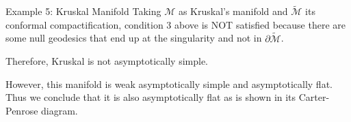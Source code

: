 \documentclass{beamer}
\begin{document}
        \begin{frame}{Example 5: Kruskal Manifold}
           	Taking $\mathcal{M}$ as Kruskal's manifold  and $\tilde{\mathcal{M}}$
its conformal compactification, condition 3 above is NOT satisfied
because there are some null geodesics that end up at the singularity
and not in $\partial\tilde{\mathcal{M}}$.\\
\pause

Therefore, Kruskal is not asymptotically simple.\\
\pause

However, this manifold is weak asymptotically simple and asymptotically flat. Thus we conclude that it is also asymptotically flat as is shown in its Carter-Penrose diagram.
        \end{frame}
        
\end{document}
